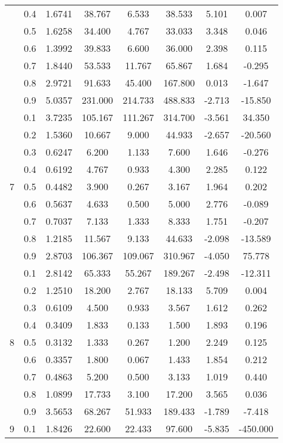 \documentclass[11pt,a4paper]{report}
\begin{document}
\begin{longtable}{ | c | c || c | c | c | c | c | c | }
 & 0.4 & 1.6741 & 38.767 & 6.533 & 38.533 & 5.101 & 0.007 \\
 & 0.5 & 1.6258 & 34.400 & 4.767 & 33.033 & 3.348 & 0.046 \\
 & 0.6 & 1.3992 & 39.833 & 6.600 & 36.000 & 2.398 & 0.115 \\
 & 0.7 & 1.8440 & 53.533 & 11.767 & 65.867 & 1.684 & -0.295 \\
 & 0.8 & 2.9721 & 91.633 & 45.400 & 167.800 & 0.013 & -1.647 \\
 & 0.9 & 5.0357 & 231.000 & 214.733 & 488.833 & -2.713 & -15.850 \\
 \hline
\multirow{9}{*}{7} & 0.1 & 3.7235 & 105.167 & 111.267 & 314.700 & -3.561 & 34.350 \\
 & 0.2 & 1.5360 & 10.667 & 9.000 & 44.933 & -2.657 & -20.560 \\
 & 0.3 & 0.6247 & 6.200 & 1.133 & 7.600 & 1.646 & -0.276 \\
 & 0.4 & 0.6192 & 4.767 & 0.933 & 4.300 & 2.285 & 0.122 \\
 & 0.5 & 0.4482 & 3.900 & 0.267 & 3.167 & 1.964 & 0.202 \\
 & 0.6 & 0.5637 & 4.633 & 0.500 & 5.000 & 2.776 & -0.089 \\
 & 0.7 & 0.7037 & 7.133 & 1.333 & 8.333 & 1.751 & -0.207 \\
 & 0.8 & 1.2185 & 11.567 & 9.133 & 44.633 & -2.098 & -13.589 \\
 & 0.9 & 2.8703 & 106.367 & 109.067 & 310.967 & -4.050 & 75.778 \\
 \hline
\multirow{9}{*}{8} & 0.1 & 2.8142 & 65.333 & 55.267 & 189.267 & -2.498 & -12.311 \\
 & 0.2 & 1.2510 & 18.200 & 2.767 & 18.133 & 5.709 & 0.004 \\
 & 0.3 & 0.6109 & 4.500 & 0.933 & 3.567 & 1.612 & 0.262 \\
 & 0.4 & 0.3409 & 1.833 & 0.133 & 1.500 & 1.893 & 0.196 \\
 & 0.5 & 0.3132 & 1.333 & 0.267 & 1.200 & 2.249 & 0.125 \\
 & 0.6 & 0.3357 & 1.800 & 0.067 & 1.433 & 1.854 & 0.212 \\
 & 0.7 & 0.4863 & 5.200 & 0.500 & 3.133 & 1.019 & 0.440 \\
 & 0.8 & 1.0899 & 17.733 & 3.100 & 17.200 & 3.565 & 0.036 \\
 & 0.9 & 3.5653 & 68.267 & 51.933 & 189.433 & -1.789 & -7.418 \\
 \hline
\multirow{9}{*}{9} & 0.1 & 1.8426 & 22.600 & 22.433 & 97.600 & -5.835 & -450.000 \\

\end{longtable}
\end{document}
